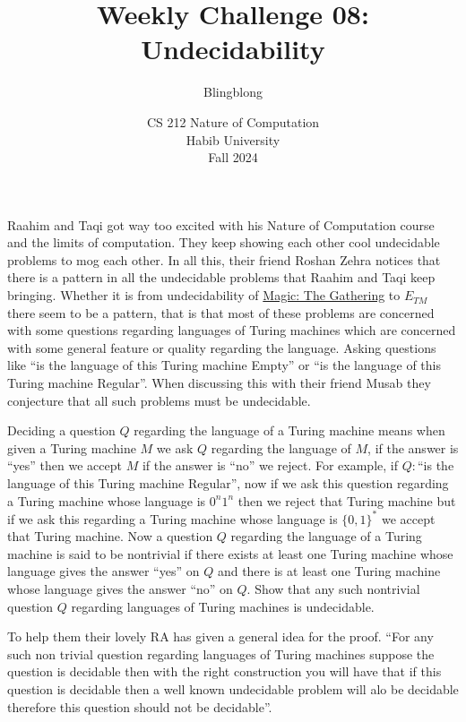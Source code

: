\documentclass[a4paper]{exam}
\title{Weekly Challenge 08: Undecidability}
\author{Blingblong} %
\date{CS 212 Nature of Computation\\Habib University\\Fall 2024}
\begin{document}
\maketitle

\begin{questions}
  
    Raahim and Taqi got way too excited with his Nature of Computation course and the limits of computation. They keep showing each other cool undecidable problems to mog each other.
    In all this, their friend Roshan Zehra notices that there is a pattern in all the undecidable problems that Raahim and Taqi keep bringing. Whether it is from undecidability of \href{https://arxiv.org/abs/1904.09828}{Magic: The Gathering} to $E_{TM}$ there seem to be a pattern, that is that most of these problems are concerned with some questions regarding languages of Turing machines which are concerned with some general feature or quality regarding the language. Asking questions like ``is the language of this Turing machine Empty'' or ``is the language of this Turing machine Regular''. When discussing this with their friend Musab they conjecture that all such problems must be undecidable.

    Deciding a question $Q$ regarding the language of a Turing machine means when given a Turing machine $M$ we ask $Q$ regarding the language of $M$, if the answer is ``yes'' then we accept $M$ if the answer is ``no'' we reject. For example, if $Q:$``is the language of this Turing machine Regular'', now if we ask this question regarding a Turing machine whose language is $0^n1^n$ then we reject that Turing machine but if we ask this regarding a Turing machine whose language is $\{0,1\}^*$ we accept that Turing machine.
    Now a question $Q$ regarding the language of a Turing machine is said to be nontrivial if there exists at least one Turing machine whose language gives the answer ``yes'' on $Q$ and there is at least one Turing machine whose language gives the answer ``no'' on $Q$. Show that any such nontrivial question $Q$ regarding languages of Turing machines is undecidable. 
   
    To help them their lovely RA has given a general idea for the proof. ``For any such non trivial question regarding languages of Turing machines suppose the question is decidable then with the right construction you will have that if this question is decidable then a well known undecidable problem will alo be decidable therefore this question should not be decidable''. 
  \begin{solution}
  \end{solution}
\end{questions}
\end{document}
